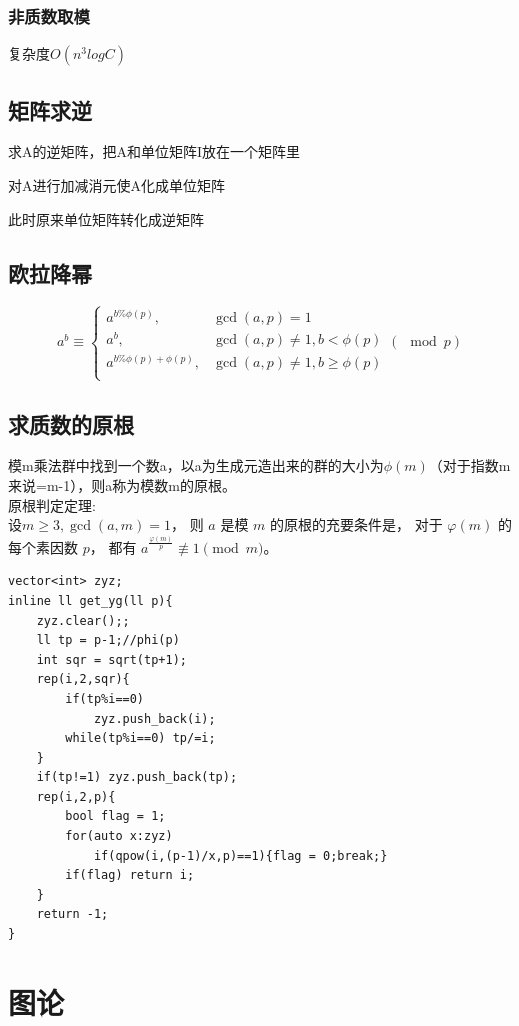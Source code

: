 \documentclass[a4]{ctexart}
\begin{document}
\subsubsection{非质数取模}
复杂度$O(n^3 logC)$

\subsection{矩阵求逆}
求A的逆矩阵，把A和单位矩阵I放在一个矩阵里\par
对A进行加减消元使A化成单位矩阵\par
此时原来单位矩阵转化成逆矩阵
\subsection{欧拉降幂}
$$
a^b \equiv \begin{cases}
a^{b\%\phi(p)} , & \gcd(a,p)=1\\
a^b , & \gcd(a,p)\neq 1,b<\phi(p)\\
a^{b\%\phi(p)+\phi(p)} , & \gcd(a,p)\neq 1 , b\geq \phi(p)\\
\end{cases}
(\mod p)
$$

\subsection{求质数的原根}
模m乘法群中找到一个数a，以a为生成元造出来的群的大小为$\phi(m)$（对于指数m来说=m-1），则a称为模数m的原根。\\
原根判定定理:\\
设$m \geq 3, \gcd(a,m)=1$，
则 $a$ 是模 $m$ 的原根的充要条件是，
对于 $\varphi(m)$ 的每个素因数 $p$，
都有 $a^{\frac{\varphi(m)}{p}}\not\equiv 1\pmod m$。
\begin{lstlisting}
vector<int> zyz;
inline ll get_yg(ll p){
    zyz.clear();;
    ll tp = p-1;//phi(p)
    int sqr = sqrt(tp+1);
    rep(i,2,sqr){
        if(tp%i==0)
            zyz.push_back(i);
        while(tp%i==0) tp/=i;
    }
    if(tp!=1) zyz.push_back(tp);
    rep(i,2,p){
        bool flag = 1;
        for(auto x:zyz)
            if(qpow(i,(p-1)/x,p)==1){flag = 0;break;}
        if(flag) return i;
    }
    return -1;
}
\end{lstlisting}

\newpage
\section{图论}
\end{document}
